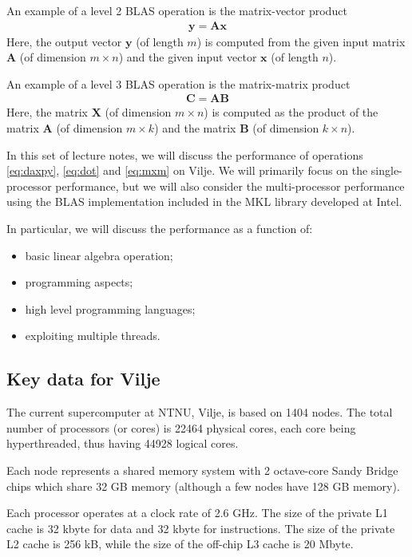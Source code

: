 An example of a level 2 BLAS operation is the matrix-vector product
\begin{align}
  \bm y = \bm A \bm x
  \label{eq:mvp}
\end{align}
Here, the output vector $\bm y$ (of length $m$) is computed from the given input
matrix $\bm A$ (of dimension $m \times n$) and the given input vector $\bm x$
(of length $n$).

An example of a level 3 BLAS operation is the matrix-matrix product
\begin{align}
  \bm C = \bm A \bm B
  \label{eq:mxm}
\end{align}
Here, the matrix $\bm X$ (of dimension $m\times n$) is computed as the product
of the matrix $\bm A$ (of dimension $m\times k$) and the matrix $\bm B$ (of
dimension $k\times n$).

In this set of lecture notes, we will discuss the performance of operations
\ref{eq:daxpy}, \ref{eq:dot} and \ref{eq:mxm} on Vilje. We will primarily focus
on the single-processor performance, but we will also consider the
multi-processor performance using the BLAS implementation included in the MKL
library developed at Intel.

In particular, we will discuss the performance as a function of:
\begin{itemize}
\item basic linear algebra operation;
\item programming aspects;
\item high level programming languages;
\item exploiting multiple threads.
\end{itemize}

\subsection{Key data for Vilje}

The current supercomputer at NTNU, Vilje, is based on 1404 nodes. The total
number of processors (or cores) is 22464 physical cores, each core being
hyperthreaded, thus having 44928 logical cores.

Each node represents a shared memory system with 2 octave-core Sandy Bridge
chips which share 32 GB memory (although a few nodes have 128 GB memory).

Each processor operates at a clock rate of 2.6 GHz. The size of the private L1
cache is 32 kbyte for data and 32 kbyte for instructions. The size of the
private L2 cache is 256 kB, while the size of the off-chip L3 cache is 20 Mbyte.

